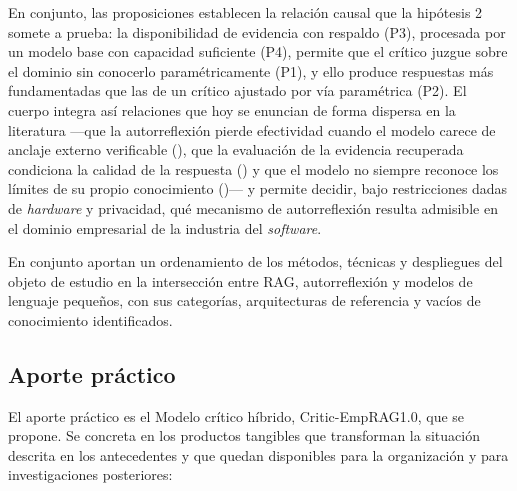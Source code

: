 En conjunto, las proposiciones establecen la relación causal que la hipótesis 2 somete a prueba: la disponibilidad de evidencia con respaldo (P3), procesada por un modelo base con capacidad suficiente (P4), permite que el crítico juzgue sobre el dominio sin conocerlo paramétricamente (P1), y ello produce respuestas más fundamentadas que las de un crítico ajustado por vía paramétrica (P2). El cuerpo integra así relaciones que hoy se enuncian de forma dispersa en la literatura ---que la autorreflexión pierde efectividad cuando el modelo carece de anclaje externo verificable (\cite{Shinn2023_Reflexion}), que la evaluación de la evidencia recuperada condiciona la calidad de la respuesta (\cite{Yan2024_CRAG}) y que el modelo no siempre reconoce los límites de su propio conocimiento (\cite{Jiang2024_KnowsWhat})--- y permite decidir, bajo restricciones dadas de \textit{hardware} y privacidad, qué mecanismo de autorreflexión resulta admisible en el dominio empresarial de la industria del \textit{software}.

En conjunto aportan un ordenamiento de los métodos, técnicas y despliegues del objeto de estudio en la intersección entre RAG, autorreflexión y modelos de lenguaje pequeños, con sus categorías, arquitecturas de referencia y vacíos de conocimiento identificados.

\subsection*{Aporte práctico}

El aporte práctico es el Modelo crítico híbrido, Critic-EmpRAG1.0, que se propone. Se concreta en los productos tangibles que transforman la situación descrita en los antecedentes y que quedan disponibles para la organización y para investigaciones posteriores:

